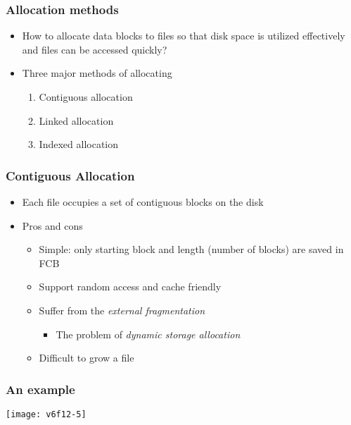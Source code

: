 \documentclass[CJKutf8,dvipsnames,table]{beamer}
\begin{document}
\begin{CJK*}{UTF8}{song}
  \begin{frame}
    \frametitle{Allocation methods} \pause
    \begin{itemize}\parskip=0pt
    \item How to allocate data blocks to files so that disk space is utilized effectively and files can be accessed quickly? \pause
    \item Three major methods of allocating \pause
      \begin{enumerate}\parskip=0pt
      \item Contiguous allocation \pause
      \item Linked allocation \pause
      \item Indexed allocation
      \end{enumerate}
    \end{itemize}
  \end{frame}
  
  \begin{frame}
    \frametitle{Contiguous Allocation} \pause
    \begin{itemize}\parskip=0pt
    \item Each file occupies a set of contiguous blocks on the disk \pause
    \item Pros and cons \pause
      \begin{itemize}\parskip=0pt
      \item Simple: only starting block and length (number of blocks) are saved in FCB \pause
      \item Support random access and cache friendly \pause
      \item Suffer from the \emph{external fragmentation} \pause

        \begin{itemize}\parskip=0pt
        \item The problem of \emph{dynamic storage allocation} \pause
        \end{itemize}

      \item Difficult to grow a file
      \end{itemize}
    \end{itemize}
  \end{frame}
  
  \begin{frame}
    \frametitle{An example} \pause
    \begin{center}
      \texttt{[image: v6f12-5]}
    \end{center}
  \end{frame}
  

\end{CJK*}
\end{document}
